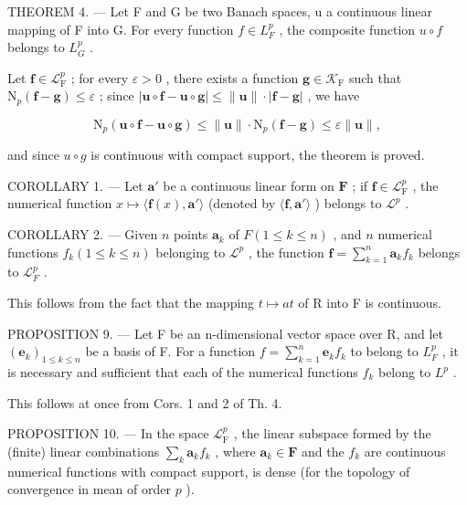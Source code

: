 THEOREM 4. --- Let F and G be two Banach spaces, u a continuous linear mapping of F into G. For every function \(f \in L_{F}^{p}\) , the composite function \(u \circ f\) belongs to \(L_{G}^{p}\) .

Let \(\mathbf{f} \in \mathcal{L}_{\mathrm{F}}^{p}\) ; for every \(\varepsilon > 0\) , there exists a function \(\mathbf{g} \in \mathcal{K}_{\mathrm{F}}\) such that \(\mathrm{N}_p(\mathbf{f} - \mathbf{g}) \leqslant \varepsilon\) ; since \(|\mathbf{u} \circ \mathbf{f} - \mathbf{u} \circ \mathbf{g}| \leqslant \| \mathbf{u} \| \cdot |\mathbf{f} - \mathbf{g}|\) , we have

\[
\mathrm{N} _ {p} (\mathbf {u} \circ \mathbf {f} - \mathbf {u} \circ \mathbf {g}) \leqslant \| \mathbf {u} \| \cdot \mathrm{N} _ {p} (\mathbf {f} - \mathbf {g}) \leqslant \varepsilon \| \mathbf {u} \|,
\]

and since \(u \circ g\) is continuous with compact support, the theorem is proved.

COROLLARY 1. --- Let \(\mathbf{a}'\) be a continuous linear form on \(\mathbf{F}\) ; if \(\mathbf{f} \in \mathcal{L}_{\mathrm{F}}^{p}\) , the numerical function \(x \mapsto \langle \mathbf{f}(x), \mathbf{a}' \rangle\) (denoted by \(\langle \mathbf{f}, \mathbf{a}' \rangle\) ) belongs to \(\mathcal{L}^p\) .

COROLLARY 2. --- Given \(n\) points \(\mathbf{a}_k\) of \(F (1 \leqslant k \leqslant n)\) , and \(n\) numerical functions \(f_k (1 \leqslant k \leqslant n)\) belonging to \(\mathcal{L}^p\) , the function \(\mathbf{f} = \sum_{k=1}^{n} \mathbf{a}_k f_k\) belongs to \(\mathcal{L}_F^p\) .

This follows from the fact that the mapping \(t \mapsto at\) of R into F is continuous.

PROPOSITION 9. --- Let F be an n-dimensional vector space over R, and let \((\mathbf{e}_{k})_{1\leqslant k\leqslant n}\) be a basis of F. For a function \(f=\sum_{k=1}^{n}\mathbf{e}_{k}f_{k}\) to belong to \(L_{F}^{p}\) , it is necessary and sufficient that each of the numerical functions \(f_{k}\) belong to \(L^{p}\) .

This follows at once from Cors. 1 and 2 of Th. 4.

PROPOSITION 10. --- In the space \(\mathcal{L}_{\mathrm{F}}^{p}\) , the linear subspace formed by the (finite) linear combinations \(\sum_{k} \mathbf{a}_{k} f_{k}\) , where \(\mathbf{a}_{k} \in \mathbf{F}\) and the \(f_{k}\) are continuous numerical functions with compact support, is dense (for the topology of convergence in mean of order \(p\) ).

